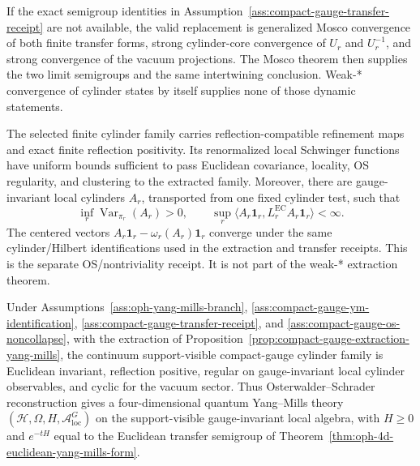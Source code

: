 \begin{remark}
\label{rem:compact-gauge-mosco-alternative}
If the exact semigroup identities in Assumption~\ref{ass:compact-gauge-transfer-receipt} are not
available, the valid replacement is generalized Mosco convergence of both finite transfer forms,
strong cylinder-core convergence of \(U_r\) and \(U_r^{-1}\), and strong convergence of the
vacuum projections. The Mosco theorem then supplies the two limit semigroups and the same
intertwining conclusion. Weak-* convergence of cylinder states by itself supplies none of those
dynamic statements.
\end{remark}

\begin{assumption}
\label{ass:compact-gauge-os-noncollapse}
The selected finite cylinder family carries reflection-compatible refinement maps and exact finite
reflection positivity. Its renormalized local Schwinger functions have uniform bounds sufficient
to pass Euclidean covariance, locality, OS regularity, and clustering to the extracted family.
Moreover, there are gauge-invariant local cylinders \(A_r\), transported from one fixed cylinder
test, such that
\[
\inf_r\operatorname{Var}_{\pi_r}(A_r)>0,
\qquad
\sup_r\langle A_r\mathbf 1_r,L_r^{\mathrm{EC}}A_r\mathbf 1_r\rangle<\infty.
\]
The centered vectors \(A_r\mathbf 1_r-\omega_r(A_r)\mathbf 1_r\) converge under the same
cylinder/Hilbert identifications used in the extraction and transfer receipts.
This is the separate OS/nontriviality receipt. It is not part of the weak-* extraction theorem.
\end{assumption}

\begin{theorem}
\label{thm:compact-gauge-os-reconstruction}
Under Assumptions~\ref{ass:oph-yang-mills-branch},
\ref{ass:compact-gauge-ym-identification},
\ref{ass:compact-gauge-transfer-receipt}, and
\ref{ass:compact-gauge-os-noncollapse}, with the extraction of
Proposition~\ref{prop:compact-gauge-extraction-yang-mills}, the continuum support-visible
compact-gauge cylinder family is Euclidean invariant, reflection positive, regular on
gauge-invariant local cylinder observables, and cyclic for the vacuum sector. Thus
Osterwalder--Schrader reconstruction gives a four-dimensional quantum Yang--Mills theory
\((\mathcal H,\Omega,H,\mathcal A_{\mathrm{loc}}^G)\) on the support-visible gauge-invariant local
algebra, with \(H\ge0\) and \(e^{-tH}\) equal to the Euclidean transfer semigroup of
Theorem~\ref{thm:oph-4d-euclidean-yang-mills-form}.
\end{theorem}

